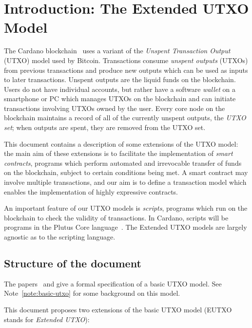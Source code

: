 \documentclass[a4paper]{article}
\newcounter{note}
\begin{document}
\maketitle

\section{Introduction: The Extended UTXO Model}
\label{sec:intro}
The Cardano blockchain~\citep{Cardano, Cardano-ledger-spec} uses a
variant of the \textit{Unspent Transaction Output} (UTXO) model used
by Bitcoin.  Transactions consume \textit{unspent outputs} (UTXOs)
from previous transactions and produce new outputs which can be used
as inputs to later transactions.  Unspent outputs are the liquid funds
on the blockchain. Users do not have individual accounts, but rather
have a software \textit{wallet} on a smartphone or PC which manages
UTXOs on the blockchain and can initiate transactions involving UTXOs
owned by the user.  Every core node on the blockchain maintains a
record of all of the currently unspent outputs, the \textit{UTXO set};
when outputs are spent, they are removed from the UTXO set.

This document contains a description of some extensions of the
UTXO model: the main aim of these extensions is to facilitate the
implementation of \textit{smart contracts}, programs which perform
automated and irrevocable transfer of funds on the blockchain, subject
to certain conditions being met.  A smart contract may involve
multiple transactions, and our aim is to define a transaction model
which enables the implementation of highly expressive contracts.

An important feature of our UTXO models is \textit{scripts},
programs which run on the blockchain to check the validity of
transactions.  In Cardano, scripts will be programs in the Plutus Core
language~\citep{Plutus-Core-spec}. The Extended UTXO models are largely
agnostic as to the scripting language.


\subsection{Structure of the document}
\label{sec:doc-structure}
The papers~\citep{Zahnentferner18-Chimeric} and
\citep{Zahnentferner18-UTxO} give a formal specification of a basic
UTXO model. See Note~\ref{note:basic-utxo} for some background on
this model.

\medskip
\noindent This document proposes two extensions of the basic UTXO
model (EUTXO stands for \textit{Extended UTXO}):
\end{document}
